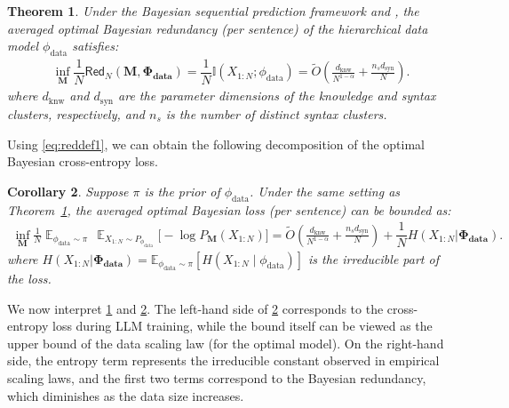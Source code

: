 \documentclass[11pt]{article}
\theoremstyle{plain}
\newtheorem{theorem}{Theorem}[section]
\newtheorem{corollary}[theorem]{Corollary}
\theoremstyle{definition}
\newcommand{\redundency}{\mathsf{Red}}
\newcommand{\Model}{\boldsymbol{M}}
\newcommand{\dataModel}{\phi_{\text{data}}}
\newcommand{\synModel}{\phi_{\text{syn}}}
\newcommand{\datafamily}{\mathbf{\Phi_{\text{data}}}}
\newcommand{\knwdimension}{d_{\text{knw}}}
\newcommand{\syndimension}{d_{\text{syn}}}
\DeclareMathOperator*{\E}{\mathbb{E}}
\newcommand{\jian}[1]{{\it \color{red}{Jian: #1}}}
\begin{document}
\begin{theorem}
\label{thm:data_scaling_Mutual_Information}
Under the Bayesian sequential prediction framework and , the averaged optimal Bayesian redundancy (per sentence) of the hierarchical data model $\dataModel$  satisfies:
    \begin{align*}
    \inf_{\Model}\dfrac{1}{N}\redundency_N(\Model,\datafamily)=\dfrac{1}{N}\mathbb{I}(X_{1:N}; \dataModel) = 
    \widetilde{O}\left(\frac{\knwdimension}{N^{1-\alpha}}+\frac{ n_s\syndimension}{N}\right).
    \end{align*}
where $\knwdimension$ and $\syndimension$ are the parameter dimensions of the knowledge and syntax clusters, respectively, and $n_s$ is the number of distinct syntax clusters.
\end{theorem}

Using \eqref{eq:reddef1}, we can obtain the following decomposition
of the optimal Bayesian cross-entropy loss.

\begin{corollary}
\label{cor:datascalinglaw}
Suppose $\pi$ is the prior of $\dataModel$.
Under the same setting as Theorem~\ref{thm:data_scaling_Mutual_Information}, the averaged optimal Bayesian loss (per sentence) 
can be bounded as:
\begin{align*}
    \inf_{\Model}\frac{1}{N}
    \E_{\dataModel\sim\pi}\,
    \E_{X_{1:N}\sim P_{\dataModel}}
    \bigl[-\log P_{\Model}(X_{1:N})\bigr]
    =
    \widetilde{O}\left(\frac{\knwdimension}{N^{1-\alpha}}+\frac{ n_s\syndimension}{N}\right)+\dfrac{1}{N}H(X_{1:N}|\datafamily).
\end{align*}
where $H(X_{1:N}|\datafamily)=
\mathbb{E}_{\dataModel\sim \pi}[H(X_{1:N}\mid \dataModel)]$
is the irreducible part of the loss.
\end{corollary}




We now interpret \cref{thm:data_scaling_Mutual_Information} and \cref{cor:datascalinglaw}.
The left-hand side of \cref{cor:datascalinglaw} corresponds to the cross-entropy loss during LLM training, while the bound itself can be viewed as   the upper bound of the data scaling law (for the optimal model). On the right-hand side, the entropy term represents the irreducible constant observed in empirical scaling laws, and the first two terms correspond to the Bayesian redundancy, which diminishes as the data size increases.
\end{document}
